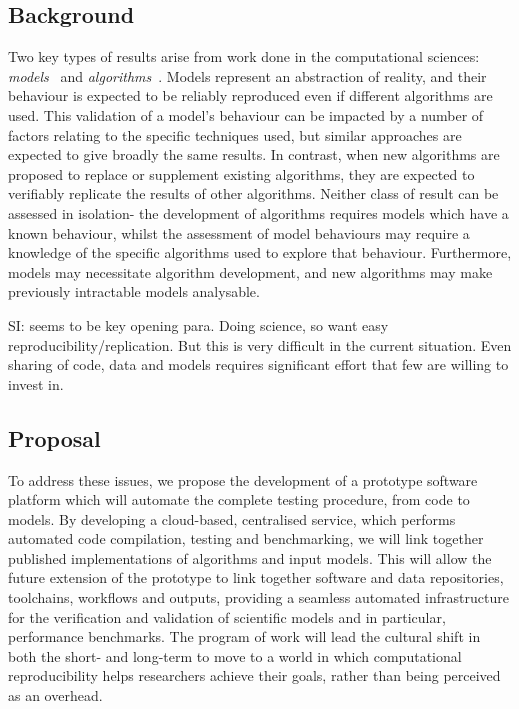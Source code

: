 \documentclass[a4paper,11pt]{article}
\begin{document}
\subsection*{Background}
Two key types of results arise from work done in the computational
sciences: {\emph{models}}~\cite{crick-et-al_recomp14} and {\emph{algorithms}}~\cite{crick-et-al_wssspe2}. Models represent an
abstraction of reality, and their behaviour is expected to be reliably
reproduced even if different algorithms are used. This validation of a
model's behaviour can be impacted by a number of factors relating to
the specific techniques used, but similar approaches are expected to
give broadly the same results.  In contrast, when new algorithms are
proposed to replace or supplement existing algorithms, they are
expected to verifiably replicate the results of other algorithms.
Neither class of result can be assessed in isolation- the development 
of algorithms requires models which have a known behaviour, whilst
the assessment of model behaviours may require a knowledge of the 
specific algorithms used to explore that behaviour. Furthermore, models
may necessitate algorithm development, and new algorithms may make 
previously intractable models analysable.

SI: seems to be key opening para. 
Doing science, so want easy reproducibility/replication. 
But this is very difficult in the current situation. Even sharing of
code, data and models requires significant effort that few are willing
to invest in.

\subsection*{Proposal}
To address these issues, we propose the development of a prototype
software platform which will automate the complete testing procedure,
from code to models. By developing a cloud-based, centralised service,
which performs automated code compilation, testing and benchmarking, 
we will link together published implementations of algorithms and 
input models. This will allow the future extension of the prototype
to link together software and data repositories, toolchains, workflows
and outputs, providing a seamless automated infrastructure for the
verification and validation of scientific models and in particular,
performance benchmarks. The program of work will lead the cultural 
shift in both the short- and long-term to move to a world in which
computational reproducibility helps researchers achieve their goals,
rather than being perceived as an overhead.
\end{document}
